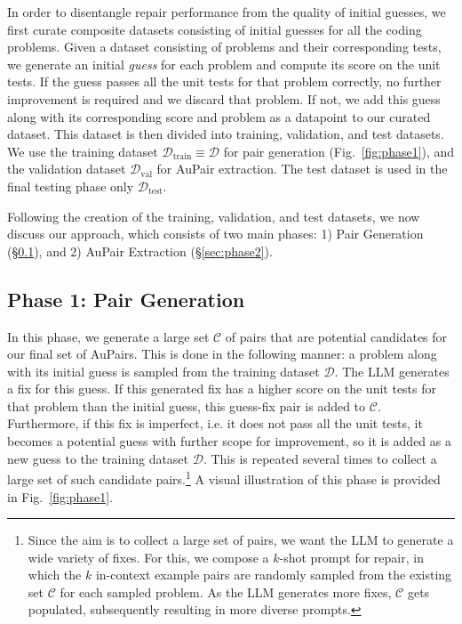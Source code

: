\documentclass[11pt, a4paper, logo, copyright]{googledeepmind}
\def\aupair/{\textcolor{golden}{Au}Pair}
\def\aupairs/{\textcolor{golden}{Au}Pairs}
\begin{document}
In order to disentangle repair performance from the quality of initial guesses, we first curate composite datasets consisting of initial guesses for all the coding problems. Given a dataset consisting of problems and their corresponding tests, we generate an initial \emph{guess} for each problem and compute its score on the unit tests. If the guess passes all the unit tests for that problem correctly, no further improvement is required and we discard that problem. If not, we add this guess along with its corresponding score and problem as a datapoint to our curated dataset. This dataset is then divided into training, validation, and test datasets. We use the training dataset $\mathcal{D}_\text{train}\equiv \mathcal{D}$ for pair generation (Fig.~\ref{fig:phase1}), and the validation dataset $\mathcal{D}_\text{val}$ for \aupair/ extraction. The test dataset is used in the final testing phase only $\mathcal{D}_\text{test}$.

Following the creation of the training, validation, and test datasets, we now discuss our approach, which consists of two main phases: 1) Pair Generation (\S\ref{sec:phase1}), and 2) \aupair/ Extraction (\S\ref{sec:phase2}).


\subsection{Phase 1: Pair Generation}
\label{sec:phase1}

In this phase, we generate a large set $\mathcal{C}$ of pairs that are potential candidates for our final set of \aupairs/. This is done in the following manner: a problem along with its initial guess is sampled from the training dataset $\mathcal{D}$. The LLM generates a fix for this guess. If this generated fix has a higher score on the unit tests for that problem than the initial guess, this guess-fix pair is added to $\mathcal{C}$. Furthermore, if this fix is imperfect, i.e. it does not pass all the unit tests, it becomes a potential guess with further scope for improvement, so it is added as a new guess to the training dataset $\mathcal{D}$. This is repeated several times to collect a large set of such candidate pairs.\footnote{Since the aim is to collect a large set of pairs, we want the LLM to generate a wide variety of fixes. For this, we compose a $k$-shot prompt for repair, in which the $k$ in-context example pairs are randomly sampled from the existing set $\mathcal{C}$ for each sampled problem. As the LLM generates more fixes, $\mathcal{C}$ gets populated, subsequently resulting in more diverse prompts.} A visual illustration of this phase is provided in Fig.~\ref{fig:phase1}.
\end{document}
